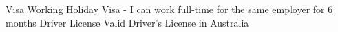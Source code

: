 

\begin{cvskills}
  \cvskill
    {Visa} %
    {Working Holiday Visa - I can work full-time for the same employer for 6 months}
  \cvskill
    {Driver License} %
    {Valid Driver's License in Australia} %


\end{cvskills}
